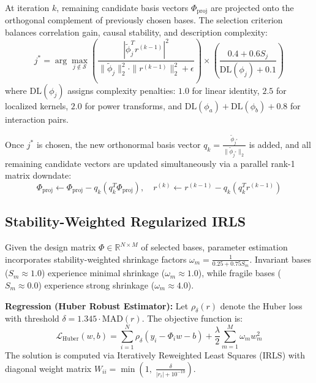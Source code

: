 \documentclass[11pt,a4paper]{article}
\begin{document}
At iteration $k$, remaining candidate basis vectors $\Phi_{\mathrm{proj}}$ are projected onto the orthogonal complement of previously chosen bases. The selection criterion balances correlation gain, causal stability, and description complexity:
\begin{equation}
    j^* = \arg\max_{j \notin \mathcal{S}} \left(\frac{|\tilde{\phi}_j^T r^{(k-1)}|^2}{\|\tilde{\phi}_j\|_2^2 \cdot \|r^{(k-1)}\|_2^2 + \epsilon}\right) \times \left(\frac{0.4 + 0.6 S_j}{\mathrm{DL}(\phi_j) + 0.1}\right)
\end{equation}
where $\mathrm{DL}(\phi_j)$ assigns complexity penalties: $1.0$ for linear identity, $2.5$ for localized kernels, $2.0$ for power transforms, and $\mathrm{DL}(\phi_a) + \mathrm{DL}(\phi_b) + 0.8$ for interaction pairs.

Once $j^*$ is chosen, the new orthonormal basis vector $q_k = \frac{\tilde{\phi}_{j^*}}{\|\tilde{\phi}_{j^*}\|_2}$ is added, and all remaining candidate vectors are updated simultaneously via a parallel rank-1 matrix downdate:
\begin{equation}
    \Phi_{\mathrm{proj}} \leftarrow \Phi_{\mathrm{proj}} - q_k \left(q_k^T \Phi_{\mathrm{proj}}\right), \quad r^{(k)} \leftarrow r^{(k-1)} - q_k \left(q_k^T r^{(k-1)}\right)
\end{equation}

\subsection{Stability-Weighted Regularized IRLS}

Given the design matrix $\Phi \in \mathbb{R}^{N \times M}$ of selected bases, parameter estimation incorporates stability-weighted shrinkage factors $\omega_m = \frac{1}{0.25 + 0.75 S_m}$. Invariant bases ($S_m \approx 1.0$) experience minimal shrinkage ($\omega_m \approx 1.0$), while fragile bases ($S_m \approx 0.0$) experience strong shrinkage ($\omega_m \approx 4.0$).

\textbf{Regression (Huber Robust Estimator):} Let $\rho_\delta(r)$ denote the Huber loss with threshold $\delta = 1.345 \cdot \mathrm{MAD}(r)$. The objective function is:
\begin{equation}
    \mathcal{L}_{\mathrm{Huber}}(w, b) = \sum_{i=1}^N \rho_\delta(y_i - \Phi_i w - b) + \frac{\lambda}{2} \sum_{m=1}^M \omega_m w_m^2
\end{equation}
The solution is computed via Iteratively Reweighted Least Squares (IRLS) with diagonal weight matrix $W_{ii} = \min(1, \; \frac{\delta}{|r_i| + 10^{-10}})$.
\end{document}
